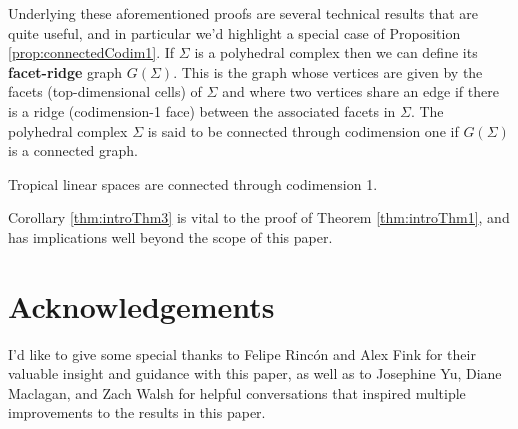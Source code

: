 Underlying these aforementioned proofs are several technical results that are quite useful, and in particular we'd highlight a special case of Proposition \ref{prop:connectedCodim1}. If $\Sigma$ is a polyhedral complex then we can define its \textbf{facet-ridge} graph $G(\Sigma)$. This is the graph whose vertices are given by the facets (top-dimensional cells) of $\Sigma$ and where two vertices share an edge if there is a ridge (codimension-1 face) between the associated facets in $\Sigma$. The polyhedral complex $\Sigma$ is said to be connected through codimension one if $G(\Sigma)$ is a connected graph.

\begin{corollary}\label{thm:introThm3}
Tropical linear spaces are connected through codimension 1.
\end{corollary}

Corollary \ref{thm:introThm3} is vital to the proof of Theorem \ref{thm:introThm1}, and has implications well beyond the scope of this paper.

\section*{Acknowledgements}
I'd like to give some special thanks to Felipe Rinc\'on and Alex Fink for their valuable insight and guidance with this paper, as well as to Josephine Yu, Diane Maclagan, and Zach Walsh for helpful conversations that inspired multiple improvements to the results in this paper.




